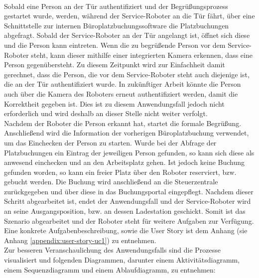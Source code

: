     \\
    \linebreak
    \pagebreak
    \linebreak
    Sobald eine Person an der Tür authentifiziert und der Begrüßungsprozess gestartet wurde, werden, während der Service-Roboter an 
    die Tür fährt, über eine Schnittstelle zur internen Büroplatzbuchungssoftware die Platzbuchungen abgefragt. 
    Sobald der Service-Roboter an der Tür angelangt ist, öffnet sich diese und die Person kann eintreten. Wenn die zu begrüßende 
    Person vor dem Service-Roboter steht, kann dieser mithilfe einer integrierten Kamera erkennen, dass eine Person gegenübersteht. 
    Zu diesem Zeitpunkt wird zur Einfachheit damit gerechnet, dass die Person, die vor dem Service-Roboter steht auch diejenige 
    ist, die an der Tür authentifiziert wurde. In zukünftiger Arbeit könnte die Person auch über die Kamera des Roboters erneut 
    authentifiziert werden, damit die Korrektheit gegeben ist. Dies ist zu diesem Anwendungsfall jedoch nicht erforderlich und 
    wird deshalb an dieser Stelle nicht weiter verfolgt.
    \\
    \linebreak
    Nachdem der Roboter die Person erkannt hat, startet die formale Begrüßung. Anschließend wird die Information der 
    vorherigen Büroplatzbuchung verwendet, um das Einchecken der Person zu starten. Wurde bei der Abfrage der Platzbuchungen ein 
    Eintrag der jeweiligen Person gefunden, so kann sich diese als anwesend einchecken und an den Arbeitsplatz gehen. Ist jedoch keine 
    Buchung gefunden worden, so kann ein freier Platz über den Roboter reserviert, bzw. gebucht werden. Die Buchung wird 
    anschließend an die Steuerzentrale zurückgegeben und über diese in das Buchungsportal eingepflegt. Nachdem dieser 
    Schritt abgearbeitet ist, endet der Anwendungsfall und der Service-Roboter wird an seine Ausgangsposition, bzw. an dessen 
    Ladestation geschickt. Somit ist das Szenario abgearbeitet und der Roboter steht für weitere Aufgaben zur Verfügung. 
    \\
    \linebreak
    Eine konkrete Aufgabenbeschreibung, sowie die User Story ist dem Anhang (sie Anhang \ref{appendix:user-story-uc1}) zu entnehmen. 
    \\
    Zur besseren Veranschaulichung des Anwendungsfalls sind die Prozesse visualisiert und folgenden Diagrammen, darunter 
    einem Aktivitätsdiagramm, einem Sequenzdiagramm und einem Ablaufdiagramm, zu entnehmen: 
    

